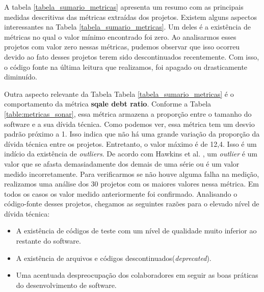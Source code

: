 A tabela \ref{tabela_sumario_metricas} apresenta um resumo com as principais medidas descritivas das métricas extraídas dos projetos. Existem alguns aspectos interessantes na Tabela \ref{tabela_sumario_metricas}. Um deles é a existência de métricas no qual o valor mínimo encontrado foi zero. Ao analisarmos esses projetos com valor zero nessas métricas, pudemos observar que isso ocorreu devido ao fato desses projetos terem sido descontinuados recentemente. Com isso, o código fonte na última leitura que realizamos, foi apagado ou drasticamente diminuído.  

Outra aspecto relevante da Tabela Tabela \ref{tabela_sumario_metricas} é o comportamento da métrica \textbf{sqale debt ratio}. Conforme a Tabela \ref{table:metricas_sonar}, essa métrica armazena a proporção entre o tamanho do software e a sua dívida técnica. Como podemos ver, essa métrica tem um desvio padrão próximo a 1. Isso indica que não há uma grande variação da proporção da dívida técnica entre os projetos.  Entretanto, o valor máximo é de 12,4. Isso é um indício da existência de \textit{outliers}. De acordo com Hawkins et al. \cite{hawkins1980identification}, um \textit{outlier} é um valor que se afasta demasiadamente dos demais de uma série ou é um valor medido incorretamente. Para verificarmos se não houve alguma falha na medição, realizamos uma análise dos 30 projetos com os maiores valores nessa métrica. Em todos os casos os valor medido anteriormente foi confirmado. Analisando o código-fonte desses projetos, chegamos as seguintes razões para o elevado nível de dívida técnica:

\begin{itemize}
\item A existência de códigos de teste com um nível de qualidade muito inferior ao restante do software.
\item A existência de arquivos e códigos descontinuados(\textit{deprecated}).
\item  Uma acentuada despreocupação dos colaboradores em seguir as boas práticas do desenvolvimento de software.
\end{itemize}


